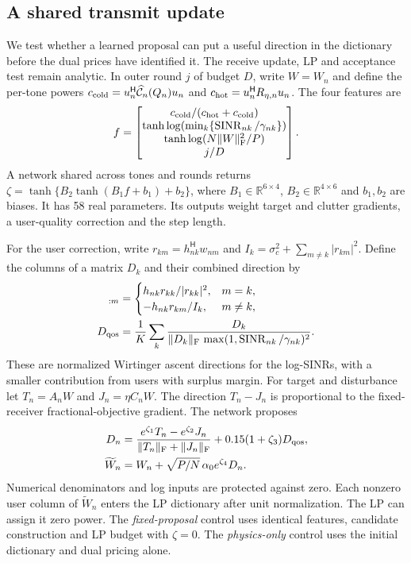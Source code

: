 \documentclass[journal]{IEEEtran}
\newcommand{\Hh}{^{\mathsf H}}
\newcommand{\F}{_{\mathrm F}}
\newcommand{\sn}{\operatorname{SINR}}
\newcommand{\norm}[1]{\lVert #1\rVert}
\begin{document}
\subsection{A shared transmit update}
We test whether a learned proposal can put a useful direction in the dictionary before the dual prices have identified it. The receive update, LP and acceptance test remain analytic. In outer round $j$ of budget $D$, write $W=W_n$ and define the per-tone powers $c_{\rm cold}=u_n\Hh\widehat{\mathcal C}_n(Q_n)u_n$ and $c_{\rm hot}=u_n\Hh R_{\eta,n}u_n$. The four features are
\begin{equation}
 f=\begin{bmatrix}
 c_{\rm cold}/(c_{\rm hot}+c_{\rm cold})\\
 \tanh\log(\min_k\{\sn_{nk}/\gamma_{nk}\})\\
 \tanh\log(N\norm{W}\F^2/P)\\ j/D
 \end{bmatrix}.
\end{equation}
A network shared across tones and rounds returns $\zeta=\tanh\{B_2\tanh(B_1f+b_1)+b_2\}$, where $B_1\in\mathbb R^{6\times4}$, $B_2\in\mathbb R^{4\times6}$ and $b_1,b_2$ are biases. It has 58 real parameters. Its outputs weight target and clutter gradients, a user-quality correction and the step length.

For the user correction, write $r_{km}=h_{nk}\Hh w_{nm}$ and $I_k=\sigma_c^2+\sum_{m\ne k}|r_{km}|^2$. Define the columns of a matrix $D_k$ and their combined direction by
\begin{align}
 [D_k]_{:m}&=
 \begin{cases}
 h_{nk}r_{kk}/|r_{kk}|^2,&m=k,\\
 -h_{nk}r_{km}/I_k,&m\ne k ,
 \end{cases}\\
 D_{\rm qos}&=\frac{1}{K}\sum_k
 \frac{D_k}{\norm{D_k}\F\,\max(1,\sn_{nk}/\gamma_{nk})^2}.
\end{align}
These are normalized Wirtinger ascent directions for the log-SINRs, with a smaller contribution from users with surplus margin. For target and disturbance let $T_n=A_nW$ and $J_n=\eta C_nW$. The direction $T_n-J_n$ is proportional to the fixed-receiver fractional-objective gradient. The network proposes
\begin{align}
 D_n&=\frac{e^{\zeta_1}T_n-e^{\zeta_2}J_n}
              {\norm{T_n}\F+\norm{J_n}\F}
             +0.15(1+\zeta_3)D_{\rm qos},\\
 \widetilde W_n&=W_n+\sqrt{P/N}\,\alpha_0 e^{\zeta_4}D_n .
\end{align}
Numerical denominators and log inputs are protected against zero. Each nonzero user column of $\widetilde W_n$ enters the LP dictionary after unit normalization. The LP can assign it zero power. The \emph{fixed-proposal} control uses identical features, candidate construction and LP budget with $\zeta=0$. The \emph{physics-only} control uses the initial dictionary and dual pricing alone.
\end{document}
